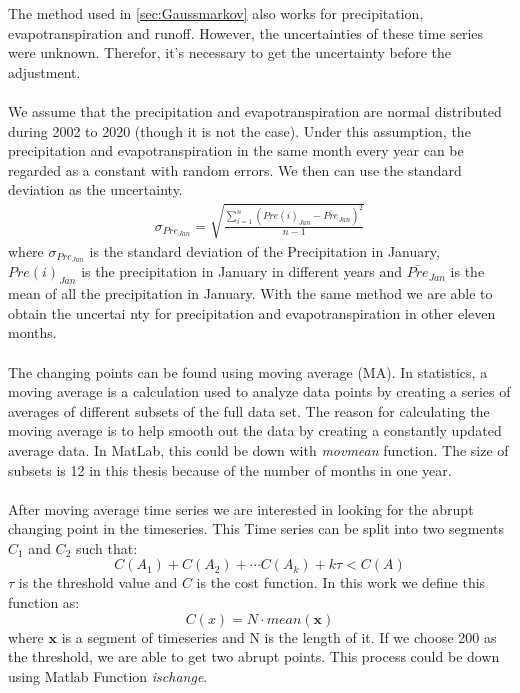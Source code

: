 The method used in \autoref{sec:Gaussmarkov} also works for precipitation, evapotranspiration and runoff. However, the uncertainties of these time series were unknown. Therefor, it's necessary to get the uncertainty before the adjustment. \\\\
We assume that the precipitation and evapotranspiration are normal distributed during 2002 to 2020 (though it is not the case). Under this assumption, the precipitation and evapotranspiration in the same month every year can be regarded as a constant with random errors. We then can use the standard deviation as the uncertainty.
\begin{gather}
\sigma_{Pre_{Jan}} = \sqrt{\frac{\sum_{i=1}^{n} (Pre(i)_{Jan} - \bar{Pre}_{Jan})^2}{n-1}}
\end{gather}
where $\sigma_{Pre_{Jan}}$ is the standard deviation of the Precipitation in January, $Pre(i)_{Jan}$ is the precipitation in January in different years and $\bar{Pre}_{Jan}$ is the mean of all the precipitation in January. With the same method we are able to obtain the uncertai nty for precipitation and evapotranspiration in other eleven months. \\\\
The changing points can be found using moving average (MA). In statistics, a moving average is a calculation used to analyze data points by creating a series of averages of different subsets of the full data set. The reason for calculating the moving average is to help smooth out the data by creating a constantly updated average data. In MatLab, this could be down with \textit{movmean} function. The size of subsets is 12 in this thesis because of the number of months in one year.\\\\
After moving average time series we are interested in looking for the abrupt changing point in the timeseries. This Time series can be split into two segments $C_1$ and $C_2$ such that: \cite{killick2012optimal}
\begin{equation}
	C(A_1) + C(A_2) + \cdots C(A_k) + k \tau < C(A)
\end{equation}
$\tau$ is the threshold value and $C$ is the cost function. In this work we define this function as:
\begin{equation}
	C(x) = N \cdot mean(\bm{x})
\end{equation}
where $\bm{x}$ is a segment of timeseries and N is the length of it. If we choose 200 as the threshold, we are able to get two abrupt points. This process could be down using Matlab Function \textit{ischange}. 
